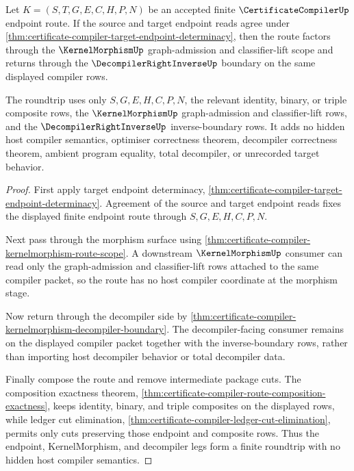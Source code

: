 \begin{theorem}
\label{thm:certificate-compiler-endpoint-kernelmorphism-roundtrip}
Let $K=(S,T,G,E,C,H,P,N)$ be an accepted finite $\CertificateCompilerUp$ endpoint route. If the source and target endpoint reads agree under \autoref{thm:certificate-compiler-target-endpoint-determinacy}, then the route factors through the $\KernelMorphismUp$ graph-admission and classifier-lift scope and returns through the $\DecompilerRightInverseUp$ boundary on the same displayed compiler rows.

The roundtrip uses only $S,G,E,H,C,P,N$, the relevant identity, binary, or triple composite rows, the $\KernelMorphismUp$ graph-admission and classifier-lift rows, and the $\DecompilerRightInverseUp$ inverse-boundary rows. It adds no hidden host compiler semantics, optimiser correctness theorem, decompiler correctness theorem, ambient program equality, total decompiler, or unrecorded target behavior.
\end{theorem}
\begin{proof}
First apply target endpoint determinacy, \autoref{thm:certificate-compiler-target-endpoint-determinacy}. Agreement of the source and target endpoint reads fixes the displayed finite endpoint route through $S,G,E,H,C,P,N$.

Next pass through the morphism surface using \autoref{thm:certificate-compiler-kernelmorphism-route-scope}. A downstream $\KernelMorphismUp$ consumer can read only the graph-admission and classifier-lift rows attached to the same compiler packet, so the route has no host compiler coordinate at the morphism stage.

Now return through the decompiler side by \autoref{thm:certificate-compiler-kernelmorphism-decompiler-boundary}. The decompiler-facing consumer remains on the displayed compiler packet together with the inverse-boundary rows, rather than importing host decompiler behavior or total decompiler data.

Finally compose the route and remove intermediate package cuts. The composition exactness theorem, \autoref{thm:certificate-compiler-route-composition-exactness}, keeps identity, binary, and triple composites on the displayed rows, while ledger cut elimination, \autoref{thm:certificate-compiler-ledger-cut-elimination}, permits only cuts preserving those endpoint and composite rows. Thus the endpoint, KernelMorphism, and decompiler legs form a finite roundtrip with no hidden host compiler semantics.
\end{proof}
